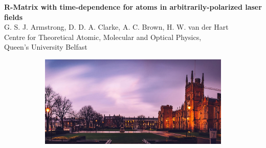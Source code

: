 \documentclass{fancyslides}
\begin{document}
%


\begin{frame}

\begin{center}
{\bf\large R-Matrix with time-dependence for atoms in arbitrarily-polarized laser fields}
\\ \vspace{0.1in}
\small
G. S. J. Armstrong, D. D. A. Clarke, A. C. Brown, H. W. van der Hart
\\ 
\vspace{0.1in}
Centre for Theoretical Atomic, Molecular and Optical Physics,
\\
Queen's University Belfast
\end{center}





\vspace{-0.2in}
\begin{figure}
\centering


\begin{subfigure}[t]{.5\textwidth}
\centering
\vspace{0pt}%
\includegraphics[width=1.1\linewidth]{qub-night.jpg}%
\end{subfigure}
%
\begin{minipage}[t]{.4\textwidth}
\small
\vspace{0.2in}
\centering
{\it
}


\end{minipage}
\end{figure}
\end{frame}
\end{document}
